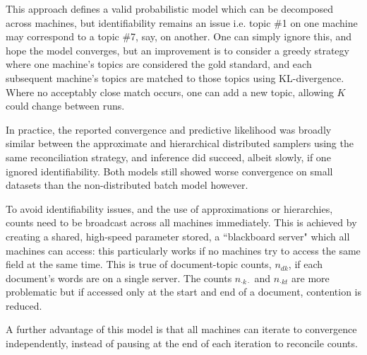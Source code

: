 This approach defines a valid probabilistic model which can be decomposed across machines, but identifiability remains an issue i.e. topic \#1 on one machine may correspond to a topic \#7, say, on another. One can simply ignore this, and hope the model converges, but an improvement is to consider a greedy strategy where one machine's topics are considered the gold standard, and each subsequent machine's topics are matched to those topics using KL-divergence. Where no acceptably close match occurs, one can add a new topic, allowing $K$ could change between runs. 

In practice\cite{Newman2009}, the reported convergence and predictive likelihood was broadly similar between the approximate and hierarchical distributed samplers using the same reconciliation strategy, and inference did succeed, albeit slowly, if one ignored identifiability. Both models still showed worse convergence on small datasets than the non-distributed batch model however.

To avoid identifiability issues, and the use of approximations or hierarchies, counts need to be broadcast across all machines immediately. This is achieved by creating a shared, high-speed parameter stored, a ``blackboard server"\cite{Smola2010} which all machines can access: this particularly works if no machines try to access the same field at the same time. This is true of document-topic counts, $n_{dk}$, if each document's words are on a single server. The counts $n_{\cdot k \cdot}$ and $n_{\cdot k t}$ are more problematic but if accessed only at the start and end of a document, contention is reduced. 

A further advantage of this model is that all machines can iterate to convergence independently, instead of pausing at the end of each iteration to reconcile counts.

